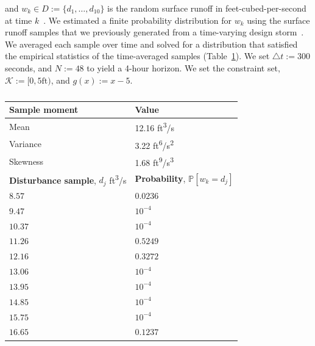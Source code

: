 \documentclass[letterpaper, 10 pt, conference]{ieeeconf}  %
\begin{document}
and $w_k \in D := \{d_1, \dots, d_{10}\}$ is the random surface runoff in feet-cubed-per-second at time $k$~\cite{sustech}.\footnotemark
{} 
We estimated a finite probability distribution for $w_k$ using the surface runoff samples that we previously generated from a time-varying design storm~\cite{sustech}. 
We averaged each sample over time and solved for a distribution
that satisfied the empirical statistics of the time-averaged samples (Table~\ref{dist}). 
We set $\triangle t := 300$ seconds, and $N := 48$ to yield a 4-hour horizon.
We set the constraint set, $\mathcal{K} := [0, 5\text{ft})$, and $g(x) := x - 5$.

\begin{table}
\begin{center}
\caption{}
\begin{tabular}{| p{3.5cm} | p{3.5cm} |}
\hline
\bf{Sample moment} & \bf{Value}  \\ \hline
Mean & 12.16 ft\textsuperscript{3}/s \\ 
Variance & 3.22 ft\textsuperscript{6}/s\textsuperscript{2} \\ 
Skewness & 1.68 ft\textsuperscript{9}/s\textsuperscript{3} \\ 
\hline 
\textbf{Disturbance sample}, $d_j$ ft\textsuperscript{3}/s & \textbf{Probability}, $\mathbb{P}[w_k = d_j]$ \\ \hline
$8.57$ 		& $0.0236$ \\
$9.47$ 		& $10^{-4}$ \\
$10.37$ 		& $10^{-4}$ \\
$11.26$  & $0.5249$ \\ 
$12.16$ & $0.3272$ \\ 
$13.06$  & $10^{-4}$ \\ 
$13.95$  & $10^{-4}$ \\ 
$14.85$  & $10^{-4}$ \\ 
$15.75$  & $10^{-4}$ \\ 
$16.65$  & $0.1237$ \\ \hline
\end{tabular}
\begin{flushleft} \end{flushleft}
\label{dist}
\end{center}
\end{table}
\end{document}
